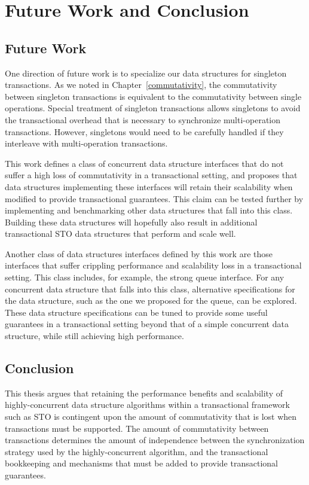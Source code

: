 \chapter{Future Work and Conclusion}

\section{Future Work}
One direction of future work is to specialize our data structures for singleton transactions. As we noted in Chapter~\ref{commutativity}, the commutativity between singleton transactions is equivalent to the commutativity between single operations. Special treatment of singleton transactions allows singletons to avoid the transactional overhead that is necessary to synchronize multi-operation transactions. However, singletons would need to be carefully handled if they interleave with multi-operation transactions. 

This work defines a class of concurrent data structure interfaces that do not suffer a high loss of commutativity in a transactional setting, and proposes that data structures implementing these interfaces will retain their scalability when modified to provide transactional guarantees. This claim can be tested further by implementing and benchmarking other data structures that fall into this class. Building these data structures will hopefully also result in additional transactional STO data structures that perform and scale well.

Another class of data structures interfaces defined by this work are those interfaces that suffer crippling performance and scalability loss in a transactional setting. This class includes, for example, the strong queue interface. For any concurrent data structure that falls into this class, alternative specifications for the data structure, such as the one we proposed for the queue, can be explored. These data structure specifications can be tuned to provide some useful guarantees in a transactional setting beyond that of a simple concurrent data structure, while still achieving high performance. 

\section{Conclusion}
This thesis argues that retaining the performance benefits and scalability of highly-concurrent data structure algorithms within a transactional framework such as STO is contingent upon the amount of commutativity that is lost when transactions must be supported. The amount of commutativity between transactions determines the amount of independence between the synchronization strategy used by the highly-concurrent algorithm, and the transactional bookkeeping and mechanisms that must be added to provide transactional guarantees.

